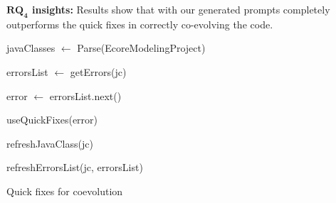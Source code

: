 \begin{tcolorbox}[boxsep=-2pt]
	\textbf{$\boldsymbol{RQ_4}$ insights:}
	Results show that \LLM with our generated prompts completely outperforms the quick fixes in correctly co-evolving the code. 
\end{tcolorbox}




\begin{algorithm2e}[t]
	\small
	\SetAlgoLined
	javaClasses $\leftarrow$ Parse(EcoreModelingProject)
	
	{
		errorsList $\leftarrow $ getErrors(jc)
		
		{
			error  $\leftarrow$ errorsList.next()
			
			
			{
				useQuickFixes(error) %
			}
			
			
			refreshJavaClass(jc) 
			
			refreshErrorsList(jc, errorsList)
		}
		
	}
	
	\caption{Quick fixes for coevolution}
	\label{algo :quickfixes}
\end{algorithm2e}



